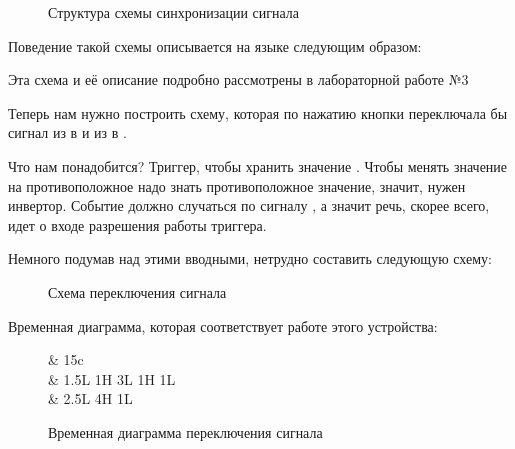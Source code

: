 {\begin{figure}[H]
	\centering
	\def\svgwidth{\columnwidth}
	
	\caption{Структура схемы синхронизации сигнала}
\end{figure}

\par{Поведение такой схемы описывается на языке  следующим образом:}



\par{Эта схема и её описание подробно рассмотрены в лабораторной работе №3}

\par{Теперь нам нужно построить схему, которая по нажатию кнопки переключала бы сигнал  из  в  и из  в .}

\par{Что нам понадобится? Триггер, чтобы хранить значение . Чтобы менять значение на противоположное надо знать противоположное значение, значит, нужен инвертор. Событие должно случаться по сигналу , а значит речь, скорее всего, идет о входе разрешения работы триггера.}

\par{Немного подумав над этими вводными, нетрудно составить следующую схему:}

\begin{figure}[H]
	\centering
	\def\svgwidth{\columnwidth}
	
	\caption{Схема переключения сигнала }
\end{figure}

\par{Временная диаграмма, которая соответствует работе этого устройства:}

\begin{figure}[H]
\centering
\begin{tikztimingtable}[%
    timing/dslope=0.1,
    timing/.style={x=5ex,y=2ex},
    very thick,
    x=3ex,
    timing/rowdist=3.3ex,
    timing/name/.style={font=\sffamily\scriptsize},
]
					& 15{c} \\
		& 1.5L 1H 3L 1H 1L\\
			& 2.5L 4H 1L\\
\extracode
\end{tikztimingtable}
\caption{Временная диаграмма переключения сигнала }
\end{figure}

}
